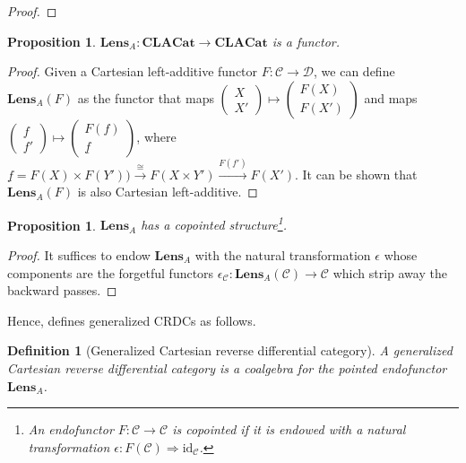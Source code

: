 \documentclass[11pt,a4paper,openright,twoside]{report}
\newcounter{mycounter}
\theoremstyle{plain}
\newtheorem{proposition}[mycounter]{Proposition}
\newtheorem{definition}[mycounter]{Definition}
\theoremstyle{definition}
\begin{document}
\begin{proof}
\end{proof}

\begin{proposition}
  $\mathbf{Lens}_A: \mathbf{CLACat} \to \mathbf{CLACat}$ is a functor.
\end{proposition}
\begin{proof}
  Given a Cartesian left-additive functor $F: \mathcal{C} \to \mathcal{D}$, we can define $\mathbf{Lens}_A(F)$ as the functor that maps $\left(\begin{smallmatrix}X  \\ X' \end{smallmatrix}\right) \mapsto \left(\begin{smallmatrix} F(X) \\ F(X') \end{smallmatrix}\right)$ and maps $\left(\begin{smallmatrix}f  \\ f' \end{smallmatrix}\right) \mapsto \left(\begin{smallmatrix} F(f) \\ \underline{f} \end{smallmatrix}\right)$, where $\underline{f} = F(X) \times F(Y')) \stackrel{\cong}{\longrightarrow} F(X \times Y') \stackrel{F(f')}{\longrightarrow}F(X')$. It can be shown that $\mathbf{Lens}_A(F)$ is also Cartesian left-additive.
\end{proof}

\begin{proposition}
  $\mathbf{Lens}_A$ has a copointed structure\footnote{An endofunctor $F: \mathcal{C} \to \mathcal{C}$ is copointed if it is endowed with a natural transformation $\epsilon: F(\mathcal{C}) \Rightarrow \mathrm{id}_{\mathcal{C}}$.}.
\end{proposition}
\begin{proof}
  It suffices to endow $\mathbf{Lens}_A$ with the natural transformation $\epsilon$ whose components are the forgetful functors $\epsilon_{\mathcal{C}}: \mathbf{Lens}_A(\mathcal{C}) \to \mathcal{C}$ which strip away the backward passes.
\end{proof}

Hence, \cite{gavranovic2024fundamental} defines generalized CRDCs as follows.

\begin{definition}[Generalized Cartesian reverse differential category]
  A generalized Cartesian reverse differential category is a coalgebra for the pointed endofunctor $\mathbf{Lens}_A$. 
\end{definition}
\end{document}
